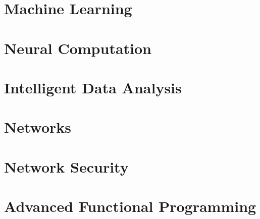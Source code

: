 \documentclass[12pt, a4paper, oneside, titlepage]{report}
\begin{document}
\newpage
\tableofcontents
\newpage
{}

\chapter{Machine Learning}

\chapter{Neural Computation}

\chapter{Intelligent Data Analysis}

\chapter{Networks}

\chapter{Network Security}

\chapter{Advanced Functional Programming}

\end{document}
